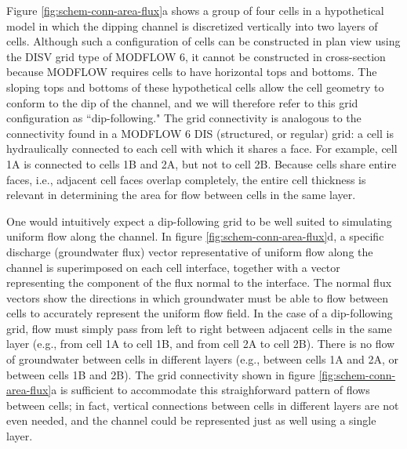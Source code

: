 \documentclass{article}
\begin{document}
Figure \ref{fig:schem-conn-area-flux}a shows a group of four cells in a hypothetical model in which the dipping channel is discretized vertically into two layers of cells. Although such a configuration of cells can be constructed in plan view using the DISV grid type of MODFLOW 6, it cannot be constructed in cross-section because MODFLOW requires cells to have horizontal tops and bottoms. The sloping tops and bottoms of these hypothetical cells allow the cell geometry to conform to the dip of the channel, and we will therefore refer to this grid configuration as ``dip-following." The grid connectivity is analogous to the connectivity found in a MODFLOW 6 DIS (structured, or regular) grid: a cell is hydraulically connected to each cell with which it shares a face. For example, cell 1A is connected to cells 1B and 2A, but not to cell 2B. Because cells share entire faces, i.e., adjacent cell faces overlap completely, the entire cell thickness is relevant in determining the area for flow between cells in the same layer.

One would intuitively expect a dip-following grid to be well suited to simulating uniform flow along the channel. In figure \ref{fig:schem-conn-area-flux}d, a specific discharge (groundwater flux) vector representative of uniform flow along the channel is superimposed on each cell interface, together with a vector representing the component of the flux normal to the interface. The normal flux vectors show the directions in which groundwater must be able to flow between cells to accurately represent the uniform flow field. In the case of a dip-following grid, flow must simply pass from left to right between adjacent cells in the same layer (e.g., from cell 1A to cell 1B, and from cell 2A to cell 2B). There is no flow of groundwater between cells in different layers (e.g., between cells 1A and 2A, or between cells 1B and 2B). The grid connectivity shown in figure \ref{fig:schem-conn-area-flux}a is sufficient to accommodate this straighforward pattern of flows between cells; in fact, vertical connections between cells in different layers are not even needed, and the channel could be represented just as well using a single layer.
\end{document}
